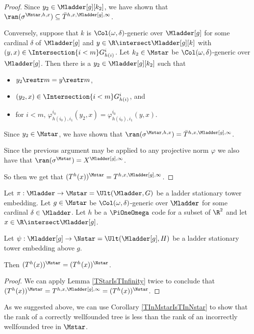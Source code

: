 \documentclass[oneside,12pt]{amsart}
\begin{document}
\begin{proof}
Since $y_2\in \Mladder[g][k_2]$,
we have shown that $\ran(\sigma^{\Mstar,h,x})\subseteq \bar{T}^{h,x,\Mladder[g],\infty}$.

Conversely, suppose that $k$ is $\Col(\omega,\delta)$-generic over $\Mladder[g]$ for some cardinal $\delta$ of $\Mladder[g]$ and
$y\in\R\intersect \Mladder[g][k]$ with $(y,x)\in \Intersection{i<m} G^i_{h(i)}$. Let $k_2\in\Mstar$ be
$\Col(\omega,\delta)$-generic over $\Mladder[g]$. Then there is a $y_2\in \Mladder[g][k_2]$ such that
\begin{itemize}
\item $y_2 \restr m = y \restr m$,
\item $(y_2,x)\in \Intersection{i<m} G^i_{h(i)}$, and
\item for $i<m$, $\varphi^{i_0}_{h(i_0),i_1}(y_2,x) = \varphi^{i_0}_{h(i_0),i_1}(y,x)$.
\end{itemize}


Since $y_2\in \Mstar$,
we have shown that $\ran(\sigma^{\Mstar,h,x}) = \bar{T}^{h,x,\Mladder[g],\infty}$.

Since the previous argument may be applied to any projective norm $\varphi$ we also have that
$\ran(\sigma^{\Mstar}) =X^{\Mladder[g],\infty}$.

So then we get that $(T^h(x))^{\Mstar} = T^{h,x,\Mladder[g],\infty}$.

\end{proof}

\begin{corollary}
\label{TInMstarIsTInNstar}
Let $\pi:\Mladder\to\Mstar=\Ult(\Mladder,G)$ be a ladder stationary tower embedding.
Let $g\in\Mstar$ be $\Col(\omega,\delta)$-generic over $\Mladder$ for some cardinal $\delta\in\Mladder$.
Let $h$ be a $\PiOneOmega$ code for a subset
of $\R^2$ and let $x\in\R\intersect \Mladder[g]$.

Let $\psi:\Mladder[g]\to\Nstar=\Ult(\Mladder[g],H)$ be a ladder stationary tower embedding above $g$.

Then $(T^h(x))^{\Mstar} = (T^h(x))^{\Nstar}$.
\end{corollary}
\begin{proof}
We can apply Lemma \ref{TStarIsTInfinity} twice to conclude that $(T^h(x))^{\Mstar} = T^{h,x,\Mladder[g],\infty} = (T^h(x))^{\Nstar}$.
\end{proof}

As we suggested above, we can use Corollary \ref{TInMstarIsTInNstar} to show that the rank of a correctly wellfounded tree is less
than the rank of an incorrectly wellfounded tree in $\Mstar$.
\end{document}
